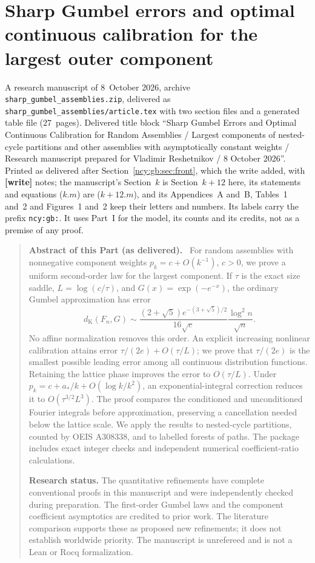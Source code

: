 \documentclass[11pt,letterpaper]{article}
\numberwithin{equation}{section}
\theoremstyle{remark}\newtheorem{remark}[theorem]{Remark}
\newcommand{\file}[1]{\nolinkurl{#1}}
\theoremstyle{definition}\newtheorem{definition}[theorem]{Definition}\theoremstyle{plain}
\newcommand{\DK}{d_{\mathrm K}}
\newenvironment{partabstract}{\begin{quote}\small\noindent\textbf{Abstract of this Part (as delivered).}\ }{\end{quote}}
\newcommand{\partsource}[1]{\par\noindent\begin{minipage}{\textwidth}\small #1\end{minipage}\par\medskip}
\begin{document}
\part{Sharp Gumbel errors and optimal continuous calibration for the largest outer component}\label{ncy:gb:part}
\partsource{A research manuscript of 8~October 2026, archive
\file{sharp_gumbel_assemblies.zip}, delivered as
\file{sharp_gumbel_assemblies/article.tex} with two section files and a
generated table file (27~pages). Delivered title block ``Sharp Gumbel Errors
and Optimal Continuous Calibration for Random Assemblies / Largest components
of nested-cycle partitions and other assemblies with asymptotically constant
weights / Research manuscript prepared for Vladimir Reshetnikov / 8 October
2026''. Printed as delivered after Section~\ref{ncy:gb:sec:front}, which the
write added, with \textbf{[write]} notes; the manuscript's Section~$k$ is
Section~$k+12$ here, its statements and equations ($k.m$) are ($k{+}12.m$),
and its Appendices~A and~B, Tables~1 and~2 and Figures~1 and~2 keep their
letters and numbers. Its labels carry the prefix \file{ncy:gb:}. It uses
Part~I for the model, its counts and its credits, not as a premise of any
proof.}
\begin{partabstract}
For random assemblies with nonnegative component weights
\(p_k=c+O(k^{-1})\), \(c>0\), we prove a uniform second-order law for
the largest component. If \(\tau\) is the exact size saddle,
\(L=\log(c/\tau)\), and \(G(x)=\exp(-e^{-x})\), the ordinary Gumbel
approximation has error
\[
 \DK(F_n,G)\sim
 \frac{(2+\sqrt5)e^{-(3+\sqrt5)/2}}{16\sqrt c}
 \frac{\log^2 n}{\sqrt n}.
\]
No affine normalization removes this order. An explicit increasing
nonlinear calibration attains error
\(\tau/(2e)+O(\tau/L)\); we prove that \(\tau/(2e)\) is the smallest
possible leading error among all continuous distribution functions.
Retaining the lattice phase improves the error to \(O(\tau/L)\).
Under \(p_k=c+a_*/k+O(\log k/k^2)\), an exponential-integral correction
reduces it to \(O(\tau^{3/2}L^3)\). The proof compares the conditioned
and unconditioned Fourier integrals before approximation, preserving
a cancellation needed below the lattice scale. We apply the results
to nested-cycle partitions, counted by OEIS A308338, and to labelled
forests of paths. The package includes exact integer checks and
independent numerical coefficient-ratio calculations.

\smallskip\noindent
\textbf{Research status.}
The quantitative refinements have complete conventional proofs in this
manuscript and were independently checked during preparation. The
first-order Gumbel laws and the component coefficient asymptotics are
credited to prior work. The literature comparison supports these as
proposed new refinements; it does not establish worldwide priority.
The manuscript is unrefereed and is not a Lean or Rocq formalization.
\end{partabstract}
\end{document}
